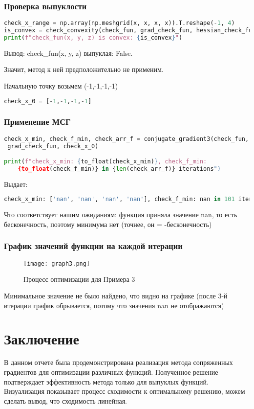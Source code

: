 \documentclass{article}
\begin{document}
\subsubsection{Проверка выпуклости}
\begin{lstlisting}[language=Python]
check_x_range = np.array(np.meshgrid(x, x, x, x)).T.reshape(-1, 4)
is_convex = check_convexity(check_fun, grad_check_fun, hessian_check_fun, check_x_range)
print(f"check_fun(x, y, z) is convex: {is_convex}")
\end{lstlisting}

Вывод: check\_fun(x, y, z) выпуклая: False.

Значит, метод к ней предположительно не применим.

Начальную точку возьмем (-1,-1,-1,-1)

\begin{lstlisting}[language=Python]
check_x_0 = [-1,-1,-1,-1]
\end{lstlisting}

\newpage
\subsubsection{Применение МСГ}

\begin{lstlisting}[language=Python]
check_x_min, check_f_min, check_arr_f = conjugate_gradient3(check_fun,
 grad_check_fun, check_x_0)

print(f"check_x_min: {to_float(check_x_min)}, check_f_min:
	{to_float(check_f_min)} in {len(check_arr_f)} iterations")
\end{lstlisting}

Выдает:

\begin{lstlisting}[language=Python]
check_x_min: ['nan', 'nan', 'nan', 'nan'], check_f_min: nan in 101 iterations
\end{lstlisting}

Что соответствует нашим ожиданиям: функция приняла значение nan, то есть бесконечность, поэтому минимума нет (точнее, он = -бесконечность)

\subsubsection{График значений функции на каждой итерации}

\begin{figure}[H]
    \centering
    \texttt{[image: graph3.png]}
    \caption{Процесс оптимизации для Примера 3}
\end{figure}

Минимальное значение не было найдено, что видно на графике (после 3-й итерации график обрывается, потому что значения nan не отображаются)

\newpage
\section{Заключение}
В данном отчете была продемонстрирована реализация метода сопряженных градиентов для оптимизации различных функций. Полученное решение подтверждает эффективность метода только для выпуклых функций. Визуализация показывает процесс сходимости к оптимальному решению, можем сделать вывод, что сходимость линейная.
\end{document}
